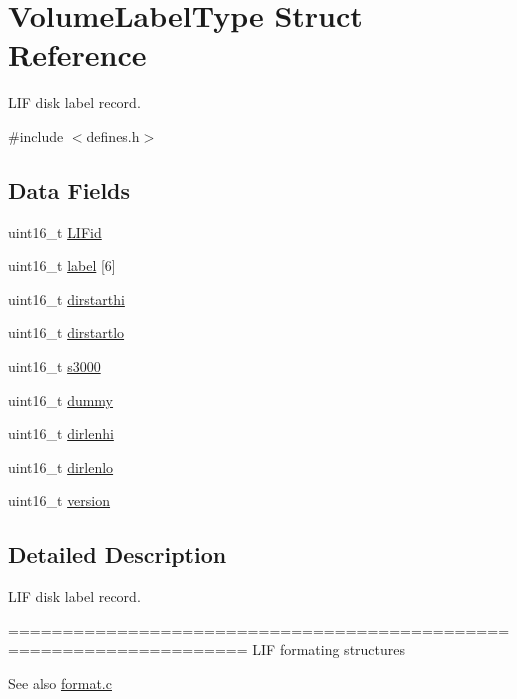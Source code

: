 \hypertarget{structVolumeLabelType}{}\section{Volume\+Label\+Type Struct Reference}
\label{structVolumeLabelType}


L\+IF disk label record.  




{\ttfamily \#include $<$defines.\+h$>$}

\subsection*{Data Fields}
\begin{DoxyCompactItemize}
\item 
uint16\+\_\+t \hyperlink{structVolumeLabelType_a16bdde2d19114ac3238477c29fe75b4a}{L\+I\+Fid}
\item 
uint16\+\_\+t \hyperlink{structVolumeLabelType_a265fc834b203868cc48482a8be64f60c}{label} \mbox{[}6\mbox{]}
\item 
uint16\+\_\+t \hyperlink{structVolumeLabelType_aac87a089bec0cf282bf23038937d7635}{dirstarthi}
\item 
uint16\+\_\+t \hyperlink{structVolumeLabelType_a193c89f442656a080244f284f1bc008a}{dirstartlo}
\item 
uint16\+\_\+t \hyperlink{structVolumeLabelType_ac7659e37fbb2bcb0b66c0a0172f9b16c}{s3000}
\item 
uint16\+\_\+t \hyperlink{structVolumeLabelType_affbd520c08374524f13708acc05f3f4e}{dummy}
\item 
uint16\+\_\+t \hyperlink{structVolumeLabelType_a6fa349ef78a7ea0a3006e0c1f4f3a155}{dirlenhi}
\item 
uint16\+\_\+t \hyperlink{structVolumeLabelType_ae1c5205294bf4588b931057d03853d66}{dirlenlo}
\item 
uint16\+\_\+t \hyperlink{structVolumeLabelType_a59f56fd1f28549bc625aeaaa57c8d0d2}{version}
\end{DoxyCompactItemize}


\subsection{Detailed Description}
L\+IF disk label record. 

==================================================================== L\+IF formating structures \begin{DoxySeeAlso}{See also}
\hyperlink{format_8c}{format.\+c} 
\end{DoxySeeAlso}


